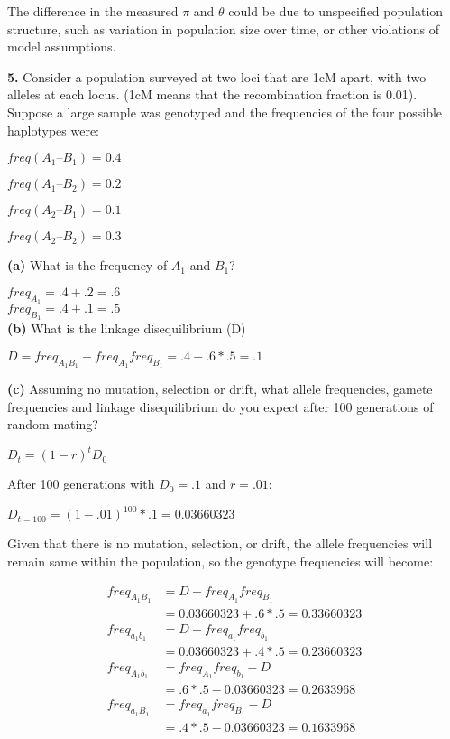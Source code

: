 \documentclass{essay}
\begin{document}
\begin{essaystyle}
The difference in the measured $\pi$ and $\theta$ could be due to unspecified
population structure, such as variation in population size over time, or other
violations of model assumptions.


\textbf{5.} Consider a population surveyed at two loci that are 1cM apart, with
two alleles at each locus. (1cM means that the recombination fraction is 0.01).
Suppose a large sample was genotyped and the frequencies of the four possible
haplotypes were: 

$freq(A_1 – B_1) = 0.4$

$freq(A_1 – B_2) = 0.2$

$freq(A_2 – B_1) = 0.1$

$freq(A_2 – B_2) = 0.3$

\textbf{(a)} What is the frequency of $A_1$ and $B_1$?

$freq_{A_1} = .4 + .2 = .6$ \\
$freq_{B_1} = .4 + .1 = .5$ \\

\textbf{(b)} What is the linkage disequilibrium (D)

$D = freq_{A_1 B_1} - freq_{A_1}freq_{B_1} = .4 - .6*.5 = .1$

\textbf{(c)} Assuming no mutation, selection or drift, what allele frequencies, gamete
frequencies and linkage disequilibrium do you expect after 100 generations of
random mating?

$D_{t} = (1-r)^t D_0$

After 100 generations with $D_0 = .1$ and $r = .01$:

$D_{t=100} = (1-.01)^{100} *.1 = 0.03660323$

Given that there is no mutation, selection, or drift, the allele frequencies
will remain same within the population, so the genotype frequencies will
become:

\begin{align}
freq_{A_1 B_1} &= D + freq_{A_1} freq_{B_1} \\
  &= 0.03660323 + .6*.5 = 0.33660323 \\
freq_{a_1 b_1} &= D + freq_{a_1} freq_{b_1} \\
  &= 0.03660323 + .4*.5 = 0.23660323 \\
freq_{A_1 b_1} &= freq_{A_1} freq_{b_1} - D \\
  &= .6*.5 - 0.03660323 = 0.2633968 \\
freq_{a_1 B_1} &= freq_{a_1} freq_{B_1} - D \\
  &= .4*.5 - 0.03660323 = 0.1633968
\end{align}



\end{essaystyle}
\end{document}
